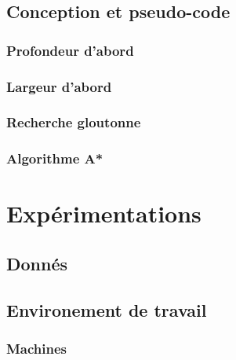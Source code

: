 \documentclass[12pt]{report}
\begin{document}
\section{Conception et pseudo-code}
\subsection{Profondeur d'abord}
\subsection{Largeur d'abord}
\subsection{Recherche gloutonne }
\subsection{Algorithme A*}


\newpage
\chapter{Expérimentations}
\section{Donnés}\label{dataSet}
\paragraph{}
\newpage
\section{Environement de travail}
\subsection{Machines}
\end{document}
